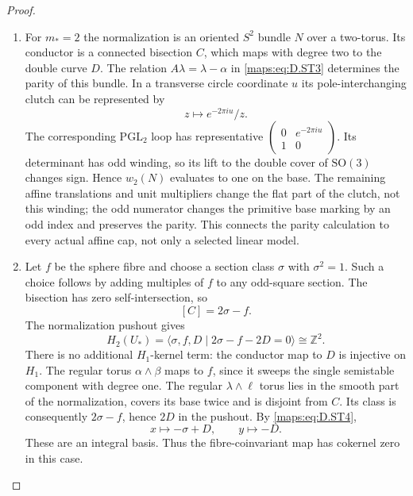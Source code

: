 \begin{proof}
\begin{enumerate}[label=\arabic*.,leftmargin=*]
\item For $m_*=2$ the normalization is an oriented $S^2$ bundle $N$
over a two-torus. Its conductor is a connected bisection $C$,
which maps with degree two to the double curve $D$. The relation
$A\lambda=\lambda-\alpha$ in \eqref{maps:eq:D.ST3} determines the parity of
this bundle. In a transverse circle coordinate $u$ its
pole-interchanging clutch can be represented by
\[
 z\longmapsto e^{-2\pi i u}/z.
\]
The corresponding $\mathrm{PGL}_2$ loop has representative
$\left(\begin{smallmatrix}0&e^{-2\pi i u}\\1&0\end{smallmatrix}\right)$.
Its determinant has odd winding, so its lift to the double cover
of $\mathrm{SO}(3)$ changes sign. Hence $w_2(N)$ evaluates to one
on the base. The remaining affine translations and unit
multipliers change the flat part of the clutch, not this winding;
the odd numerator changes the primitive base marking by an odd
index and preserves the parity. This connects the parity
calculation to every actual affine cap, not only a selected
linear model.

\item Let $f$ be the sphere fibre and choose a section class $\sigma$
with $\sigma^2=1$. Such a choice follows by adding multiples of
$f$ to any odd-square section. The bisection has zero
self-intersection, so
\[
 [C]=2\sigma-f.
\]
The normalization pushout gives
\[
 H_2(U_*)=
 \langle\sigma,f,D\mid 2\sigma-f-2D=0\rangle
          \cong\mathbb Z^2.                               \tag{D.ST6}\label{maps:eq:D.ST6}
\]
There is no additional $H_1$-kernel term: the conductor map to
$D$ is injective on $H_1$. The regular torus
$\alpha\wedge\beta$ maps to $f$, since it sweeps the single
semistable component with degree one. The regular
$\lambda\wedge\ell$ torus lies in the smooth part of the
normalization, covers its base twice and is disjoint from $C$.
Its class is consequently $2\sigma-f$, hence $2D$ in the
pushout. By \eqref{maps:eq:D.ST4},
\[
 x\longmapsto-\sigma+D,\qquad y\longmapsto-D.
\]
These are an integral basis. Thus the fibre-coinvariant map has
cokernel zero in this case.


\end{enumerate}
\end{proof}
